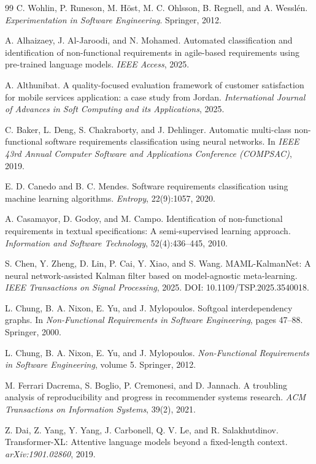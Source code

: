 \documentclass[11pt,a4paper]{article}
\begin{document}
\begin{thebibliography}{99}
 C. Wohlin, P. Runeson, M. Höst, M. C. Ohlsson, B. Regnell, and
A. Wesslén. \emph{Experimentation in Software Engineering}. Springer, 2012.

 A. Alhaizaey, J. Al-Jaroodi, and N. Mohamed. Automated classification
and identification of non-functional requirements in agile-based requirements using pre-trained
language models. \emph{IEEE Access}, 2025.

 A. Althunibat. A quality-focused evaluation framework of customer
satisfaction for mobile services application: a case study from Jordan. \emph{International
Journal of Advances in Soft Computing and its Applications}, 2025.

 C. Baker, L. Deng, S. Chakraborty, and J. Dehlinger. Automatic multi-class
non-functional software requirements classification using neural networks. In \emph{IEEE 43rd
Annual Computer Software and Applications Conference (COMPSAC)}, 2019.

 E. D. Canedo and B. C. Mendes. Software requirements classification
using machine learning algorithms. \emph{Entropy}, 22(9):1057, 2020.

 A. Casamayor, D. Godoy, and M. Campo. Identification of
non-functional requirements in textual specifications: A semi-supervised learning approach.
\emph{Information and Software Technology}, 52(4):436--445, 2010.

 S. Chen, Y. Zheng, D. Lin, P. Cai, Y. Xiao, and S. Wang.
MAML-KalmanNet: A neural network-assisted Kalman filter based on model-agnostic
meta-learning. \emph{IEEE Transactions on Signal Processing}, 2025.
  \newblock DOI: 10.1109/TSP.2025.3540018.

 L. Chung, B. A. Nixon, E. Yu, and J. Mylopoulos. Softgoal
interdependency graphs. In \emph{Non-Functional Requirements in Software Engineering},
pages 47--88. Springer, 2000.

 L. Chung, B. A. Nixon, E. Yu, and J. Mylopoulos.
\emph{Non-Functional Requirements in Software Engineering}, volume 5. Springer, 2012.

 M. Ferrari Dacrema, S. Boglio, P. Cremonesi, and D. Jannach. A troubling
analysis of reproducibility and progress in recommender systems research. \emph{ACM Transactions
on Information Systems}, 39(2), 2021.

 Z. Dai, Z. Yang, Y. Yang, J. Carbonell, Q. V. Le, and R. Salakhutdinov.
Transformer-XL: Attentive language models beyond a fixed-length context.
\emph{arXiv:1901.02860}, 2019.


\end{thebibliography}
\end{document}
